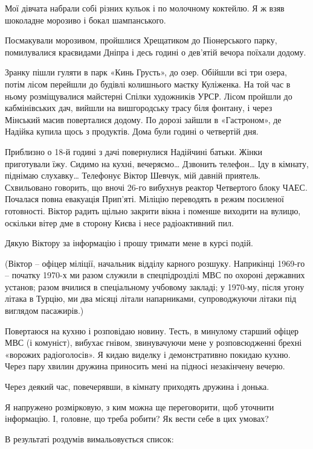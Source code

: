 Мої дівчата набрали собі різних кульок і по молочному коктейлю. Я ж взяв
шоколадне морозиво і бокал шампанського. 

Посмакували морозивом, пройшлися Хрещатиком до Піонерського парку, помилувалися
краєвидами Дніпра і десь годині о дев’ятій вечора поїхали додому.


Зранку пішли гуляти в парк «Кинь Грусть», до озер. Обійшли всі три озера, потім
лісом перейшли до будівлі колишнього маєтку Куліженка. На той час в ньому
розміщувалися майстерні Спілки художників УРСР. Лісом пройшли до кабмінівських
дач, вийшли на вишгородську трасу біля фонтану, і через Мінський масив
поверталися додому. По дорозі зайшли в «Гастроном», де Надійка купила щось з
продуктів. Дома були годині о четвертій дня. 

Приблизно о 18-й годині з дачі повернулися Надійчині батьки. Жінки приготували
їжу. Сидимо на кухні, вечеряємо… Дзвонить телефон… Іду в кімнату, піднімаю
слухавку… Телефонує Віктор Шевчук, мій давній приятель. Схвильовано говорить,
що вночі 26-го вибухнув реактор Четвертого блоку ЧАЕС. Почалася повна евакуація
Прип’яті. Міліцію переводять в режим посиленої готовності. Віктор радить щільно
закрити вікна і поменше виходити на вулицю, оскільки вітер дме в сторону Києва
і несе радіоактивний пил. 

Дякую Віктору за інформацію і прошу тримати мене в курсі подій.

(Віктор – офіцер міліції, начальник відділу карного розшуку. Наприкінці 1969-го
– початку 1970-х ми разом служили в спецпідрозділі МВС по охороні державних
установ; разом вчилися в спеціальному учбовому закладі; у 1970-му, після угону
літака в Турцію, ми два місяці літали напарниками, супроводжуючи літаки під
виглядом пасажирів.) 

Повертаюся на кухню і розповідаю новину. Тесть, в минулому старший офіцер МВС
(і комуніст), вибухає гнівом, звинувачуючи мене у розповсюдженні брехні
«ворожих радіоголосів». Я кидаю виделку і демонстративно покидаю кухню. Через
пару хвилин дружина приносить мені на підносі незакінчену вечерю.

Через деякий час, повечерявши, в кімнату приходять дружина і донька. 

Я напружено розмірковую, з ким можна ще переговорити, щоб уточнити інформацію.
І, головне, що треба робити? Як вести себе в цих умовах?

В результаті роздумів вимальовується список:

